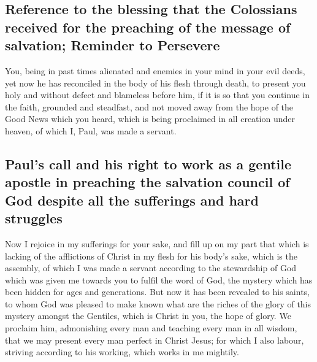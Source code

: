 \hypertarget{reference-to-the-blessing-that-the-colossians-received-for-the-preaching-of-the-message-of-salvation-reminder-to-persevere}{%
\subsection{Reference to the blessing that the Colossians received for
the preaching of the message of salvation; Reminder to
Persevere}\label{reference-to-the-blessing-that-the-colossians-received-for-the-preaching-of-the-message-of-salvation-reminder-to-persevere}}

 You, being in past times alienated and enemies in your
mind in your evil deeds,  yet now he has reconciled in
the body of his flesh through death, to present you holy and without
defect and blameless before him,  if it is so that you
continue in the faith, grounded and steadfast, and not moved away from
the hope of the Good News which you heard, which is being proclaimed in
all creation under heaven, of which I, Paul, was made a servant.

\hypertarget{pauls-call-and-his-right-to-work-as-a-gentile-apostle-in-preaching-the-salvation-council-of-god-despite-all-the-sufferings-and-hard-struggles}{%
\subsection{Paul's call and his right to work as a gentile apostle in
preaching the salvation council of God despite all the sufferings and
hard
struggles}\label{pauls-call-and-his-right-to-work-as-a-gentile-apostle-in-preaching-the-salvation-council-of-god-despite-all-the-sufferings-and-hard-struggles}}

 Now I rejoice in my sufferings for your sake, and fill
up on my part that which is lacking of the afflictions of Christ in my
flesh for his body's sake, which is the assembly,  of
which I was made a servant according to the stewardship of God which was
given me towards you to fulfil the word of God,  the
mystery which has been hidden for ages and generations. But now it has
been revealed to his saints,  to whom God was pleased to
make known what are the riches of the glory of this mystery amongst the
Gentiles, which is Christ in you, the hope of glory.  We
proclaim him, admonishing every man and teaching every man in all
wisdom, that we may present every man perfect in Christ Jesus;
 for which I also labour, striving according to his
working, which works in me mightily.

